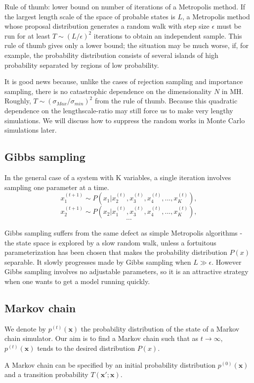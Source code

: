 \documentclass[a4paper,11pt]{article}
\newcommand{\vect}[1]{\boldsymbol{\mathbf{#1}}}
\numberwithin{equation}{section}
\begin{document}
{Rule of thumb: lower bound on number of iterations of a
Metropolis method. If the largest length scale of the space of
probable states is $L$, a Metropolis method whose proposal distribution
generates a random walk with step size $\epsilon$ must be run for at
least $T \sim (L/\epsilon)^2$ iterations to obtain an independent sample. This rule of thumb gives only a lower bound; the situation may be much
worse, if, for example, the probability distribution consists of several islands
of high probability separated by regions of low probability.

It is good news because, unlike the
cases of rejection sampling and importance sampling, there is no catastrophic
dependence on the dimensionality $N$ in MH. Roughly, $T \sim (\sigma_{Max}/\sigma_{min})^2$ from the rule of thumb. Because this quadratic dependence on the lengthscale-ratio may still force us
to make very lengthy simulations. We will discuss how to suppress the random works in Monte Carlo simulations later. 

\subsection{Gibbs sampling}

In the general case of a system with K variables, a single iteration involves
sampling one parameter at a time. 
$$
x^{(t+1)}_1 \sim P(x_1|x^{(t)}_2,x^{(t)}_3,x^{(t)}_4,...,x^{(t)}_K),
$$
$$
x^{(t+1)}_2 \sim P(x_2|x^{(t)}_1,x^{(t)}_3,x^{(t)}_4,...,x^{(t)}_K),
$$
$$
\cdots
$$

Gibbs sampling suffers from the same defect as simple Metropolis algorithms - the state space is explored by a slow random walk, unless a fortuitous parameterization
has been chosen that makes the probability distribution $P(x)$
separable. It slowly progresses made by
Gibbs sampling when $ L \gg \epsilon$. However Gibbs sampling involves no adjustable parameters, so it is an attractive
strategy when one wants to get a model running quickly.

\subsection{Markov chain}

We denote by $p^{(t)}(\vect x)$ the probability
distribution of the state of a Markov chain simulator. Our aim is to find a Markov chain such that as $t \rightarrow \infty$, $p^{(t)}(\vect x)$ tends
to the desired distribution $P(x)$.

A Markov chain can be specified by an initial probability distribution $p^{(0)}(\vect x)$ and a transition probability $T(\vect x' ; \vect x)$.

}
\end{document}
